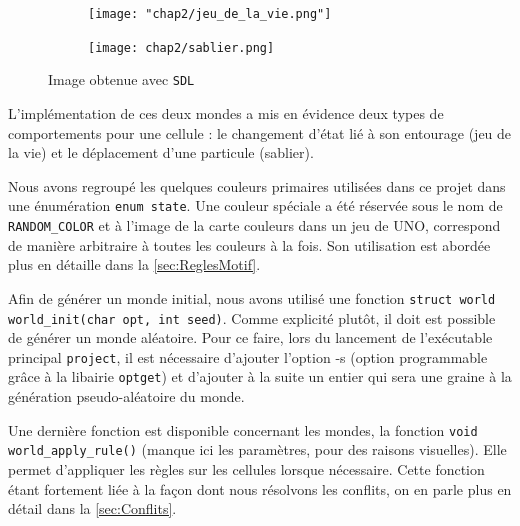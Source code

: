 \begin{figure}[ht]
    \centering
    \hspace{\fill}
    \begin{subfigure}{0.35\textwidth}
        \texttt{[image: "chap2/jeu\_de\_la\_vie.png"]}
        \label{fig:jeu_de_la_vie}
    \end{subfigure}
    \hfill
    \begin{subfigure}{0.35\textwidth}
        \texttt{[image: chap2/sablier.png]}
        \label{fig:sablier}
    \end{subfigure}
    \hspace{\fill}
    \caption{Image obtenue avec \texttt{SDL}}
    \label{fig:sdl_mondes}
\end{figure}

L'implémentation de ces deux mondes a mis en évidence deux types de comportements pour une cellule : le changement d'état lié à son entourage (jeu de la vie) et le déplacement d'une particule (sablier).

Nous avons regroupé les quelques couleurs primaires utilisées dans ce projet dans une énumération \lstinline{enum state}. Une couleur spéciale a été réservée sous le nom de \texttt{RANDOM\_COLOR} et à l'image de la carte  couleurs \fg{} dans un jeu de UNO, correspond de manière arbitraire à toutes les couleurs à la fois. Son utilisation est abordée plus en détaille dans la \autoref{sec:ReglesMotif}.


Afin de générer un monde initial, nous avons utilisé une fonction \lstinline{struct world world_init(char opt, int seed)}. Comme explicité plutôt, il doit est possible de générer un monde aléatoire. Pour ce faire, lors du lancement de l'exécutable principal \texttt{project}, il est nécessaire d'ajouter l'option -s (option programmable grâce à la libairie \texttt{optget}) et d'ajouter à la suite un entier qui sera une graine à la génération pseudo-aléatoire du monde.

Une dernière fonction est disponible concernant les mondes, la fonction \lstinline{void world_apply_rule()} (manque ici les paramètres, pour des raisons visuelles). Elle permet d'appliquer les règles sur les cellules lorsque nécessaire. Cette fonction étant fortement liée à la façon dont nous résolvons les conflits, on en parle plus en détail dans la \autoref{sec:Conflits}.

